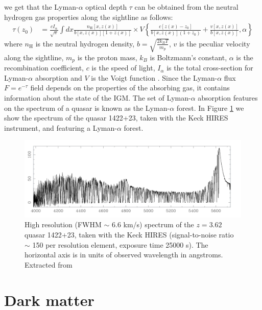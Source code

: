 we get that the Lyman-$\alpha$ optical depth $\tau$ can be obtained from the neutral hydrogen gas properties along the sightline as follows:
\begin{equation}\label{eq:lyman opacity}
    \begin{aligned}\tau(z_0)&=\frac{cI_\alpha}{\sqrt{\pi}}\int dx\frac{n_{\mathrm{H}}[x,z(x)]}{b[x,z(x)][1+z(x)]}\times V\left\{\frac{c[z(x)-z_0]}{b[x,z(x)](1+z_0)}+\frac{v[x,z(x)]}{b[x,z(x)]},\alpha\right\}\end{aligned}
\end{equation} 
where $n_\text{H}$ is the neutral hydrogen density, $b=\sqrt{\frac{2k_BT}{m_p}}$, $v$ is the peculiar velocity along the sightline, $m_p$ is the proton mass, $k_B$ is Boltzmann's constant, $\alpha$ is the recombination coefficient, $c$ is the speed of light, $I_\alpha$ is the total cross-section for Lyman-$\alpha$ absorption and $V$ is the Voigt function \cite{Choudhury_2001}. Since the Lyman-$\alpha$ flux $F=e^{-\tau}$ field depends on the properties of the absorbing gas, it contains information about the state of the IGM. The set of Lyman-$\alpha$ absorption features on the spectrum of a quasar is known as the Lyman-$\alpha$ forest. In Figure \ref{fig:forest} we show the spectrum of the quasar 1422+23, taken with the Keck HIRES instrument, and featuring a Lyman-$\alpha$ forest.

\begin{figure}[ht]
    \centering
    \includegraphics[width=1\linewidth]{img/ML/forest.png}
    \caption{High resolution (FWHM $\sim$ 6.6 km/s) spectrum of the $z = 3.62$ quasar 1422+23, taken with the Keck HIRES (signal-to-noise ratio $\sim$ 150 per resolution element, exposure time 25000 s). The horizontal axis is in units of observed wavelength in angstroms. Extracted from \cite{Rauch_1998}}
    \label{fig:forest}
\end{figure}

\section{Dark matter}\label{sec:DM}

